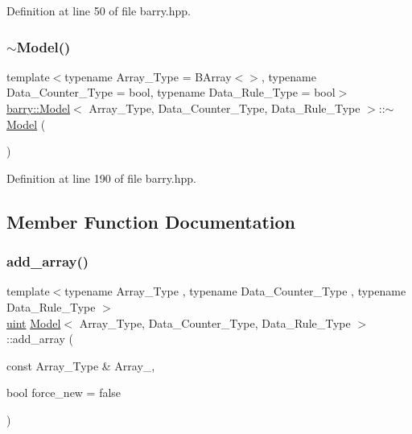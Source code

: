 Definition at line 50 of file barry.\+hpp.

\mbox{\label{classbarry_1_1_model_a2b8617c8bb1b8c76bbaa0f596af0c132}} 
\subsubsection{\texorpdfstring{$\sim$\+Model()}{~Model()}}
{\footnotesize\ttfamily template$<$typename Array\+\_\+\+Type  = B\+Array$<$$>$, typename Data\+\_\+\+Counter\+\_\+\+Type  = bool, typename Data\+\_\+\+Rule\+\_\+\+Type  = bool$>$ \\
\hyperlink{classbarry_1_1_model}{barry\+::\+Model}$<$ Array\+\_\+\+Type, Data\+\_\+\+Counter\+\_\+\+Type, Data\+\_\+\+Rule\+\_\+\+Type $>$\+::$\sim$\hyperlink{classbarry_1_1_model}{Model} (\begin{DoxyParamCaption}{ }\end{DoxyParamCaption})\hspace{0.3cm}{\ttfamily [inline]}}



Definition at line 190 of file barry.\+hpp.



\subsection{Member Function Documentation}
\mbox{\label{classbarry_1_1_model_a17a2205b52c03bb29eefb8fb126a01f6}} 
\subsubsection{\texorpdfstring{add\+\_\+array()}{add\_array()}}
{\footnotesize\ttfamily template$<$typename Array\+\_\+\+Type , typename Data\+\_\+\+Counter\+\_\+\+Type , typename Data\+\_\+\+Rule\+\_\+\+Type $>$ \\
\hyperlink{namespacebarry_a11dfc53ddb4672278319aa04f1e09a6c}{uint} \hyperlink{classbarry_1_1_model}{Model}$<$ Array\+\_\+\+Type, Data\+\_\+\+Counter\+\_\+\+Type, Data\+\_\+\+Rule\+\_\+\+Type $>$\+::add\+\_\+array (\begin{DoxyParamCaption}\item[{const Array\+\_\+\+Type \&}]{Array\+\_\+,  }\item[{bool}]{force\+\_\+new = {\ttfamily false} }\end{DoxyParamCaption})\hspace{0.3cm}{\ttfamily [inline]}}



